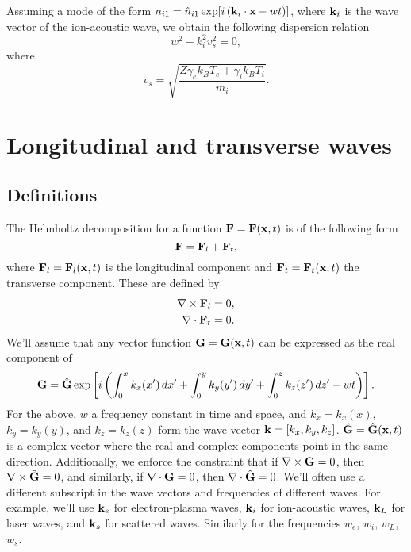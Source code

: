 \documentclass[a4paper,11pt]{report}
\begin{document}
Assuming a mode of the form $n_{i1} = \hat{n}_{i1} \exp [ i \left ( \mathbf{k}_i \cdot \mathbf{x} - w t \right ) ]$, where $\mathbf{k}_i$ is the wave vector of the ion-acoustic wave, we obtain the following dispersion relation
\begin{equation}
    w^2 - k_i^2 v_s^2 = 0,
\end{equation}
where
\begin{equation}
    v_s = \sqrt{ \frac{Z \gamma_e k_B T_e + \gamma_i k_B T_i }{m_i} }.
\end{equation}

\chapter{Longitudinal and transverse waves}
\section{Definitions}
The Helmholtz decomposition for a function $\mathbf{F} = \mathbf{F}(\mathbf{x},t)$ is of the following form
\begin{equation}
    \mathbf{F} = \mathbf{F}_l + \mathbf{F}_t,
\end{equation}
where $\mathbf{F}_l = \mathbf{F}_l(\mathbf{x},t)$ is the longitudinal component and $\mathbf{F}_t = \mathbf{F}_t(\mathbf{x},t)$ the transverse component. These are defined by
\begin{align}
    \nabla \times \mathbf{F}_l &= 0, \label{eq:ltw_plasma_long_def}\\
    \nabla \cdot \mathbf{F}_t &= 0. \label{eq:ltw_plasma_tran_def}
\end{align}
We'll assume that any vector function $\mathbf{G} = \mathbf{G}(\mathbf{x},t)$ can be expressed as the real component of
\begin{equation}
    \label{eq:em_more_general_wave_form}
    \mathbf{G} = \hat{\mathbf{G}} \exp \left [ i \left ( \int_0^x k_x(x') \, dx' + \int_0^y k_y(y') \, dy' + \int_0^z k_z(z') \, dz'  - wt \right ) \right ].
\end{equation}
For the above, $w$ a frequency constant in time and space, and $k_x = k_x(x)$, $k_y = k_y(y)$, and $k_z = k_z(z)$ form the wave vector $\mathbf{k} = [k_x, k_y, k_z]$. $\hat{\mathbf{G}} = \hat{\mathbf{G}}(\mathbf{x},t)$ is a complex vector where the real and complex components point in the same direction. Additionally, we enforce the constraint that if $\nabla \times \mathbf{G} = 0$, then $\nabla \times \hat{\mathbf{G}} = 0$, and similarly, if $\nabla \cdot \mathbf{G} = 0$, then $\nabla \cdot \hat{\mathbf{G}} = 0$. We'll often use a different subscript in the wave vectors and frequencies of different waves. For example, we'll use $\mathbf{k}_e$ for electron-plasma waves, $\mathbf{k}_i$ for ion-acoustic waves, $\mathbf{k}_L$ for laser waves, and $\mathbf{k}_s$ for scattered waves. Similarly for the frequencies $w_e$, $w_i$, $w_L$, $w_s$.
\end{document}
